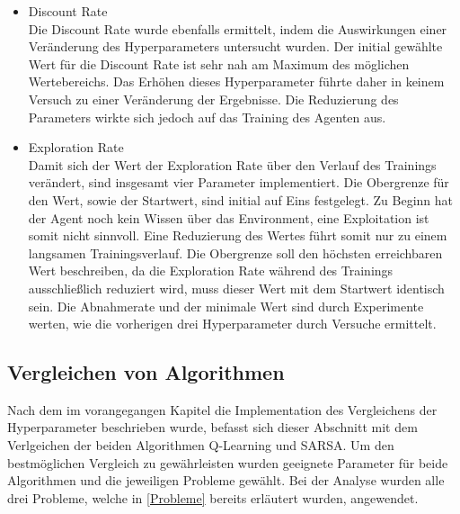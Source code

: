 \begin{itemize}
    \item Discount Rate\\
    Die Discount Rate wurde ebenfalls ermittelt, indem die Auswirkungen einer Veränderung des Hyperparameters untersucht wurden. 
    Der initial gewählte Wert für die Discount Rate ist sehr nah am Maximum des möglichen Wertebereichs. 
    Das Erhöhen dieses Hyperparameter führte daher in keinem Versuch zu einer Veränderung der Ergebnisse. 
    Die Reduzierung des Parameters wirkte sich jedoch auf das Training des Agenten aus.

    \item Exploration Rate\\
    Damit sich der Wert der Exploration Rate über den Verlauf des Trainings verändert, sind insgesamt vier Parameter implementiert. 
    Die Obergrenze für den Wert, sowie der Startwert, sind initial auf Eins festgelegt. 
    Zu Beginn hat der Agent noch kein Wissen über das Environment, eine Exploitation ist somit nicht sinnvoll. 
    Eine Reduzierung des Wertes führt somit nur zu einem langsamen Trainingsverlauf. 
    Die Obergrenze soll den höchsten erreichbaren Wert beschreiben, da die Exploration Rate während des Trainings ausschließlich reduziert wird, muss dieser Wert mit dem Startwert identisch sein.
    Die Abnahmerate und der minimale Wert sind durch Experimente werten, wie die vorherigen drei Hyperparameter durch Versuche ermittelt.
\end{itemize}


\subsection{Vergleichen von Algorithmen}

Nach dem im vorangegangen Kapitel die Implementation des Vergleichens der Hyperparameter beschrieben wurde, befasst sich dieser Abschnitt mit dem Verlgeichen der beiden Algorithmen Q-Learning und SARSA. 
Um den bestmöglichen Vergleich zu gewährleisten wurden geeignete Parameter für beide Algorithmen und die jeweiligen Probleme gewählt. Bei der Analyse wurden alle drei Probleme, welche in \ref{Probleme} bereits erläutert wurden, angewendet.


